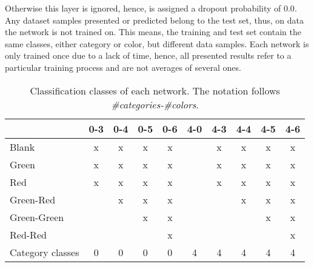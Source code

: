 Otherwise this layer is ignored, hence, is assigned a dropout probability of $0.0$.
Any dataset samples presented or predicted belong to the test set, thus, on data the network is not trained on.
This means, the training and test set contain the same classes, either category or color, but different data samples.
Each network is only trained once due to a lack of time, hence, all presented results refer to a particular training process and are not averages of several ones.
\begin{table}[]
\centering
\caption[Classification classes of each network]{Classification classes of each network. The notation follows \emph{\#categories-\#colors}.}
\label{tab:network-classes}
\begin{tabular}{l|ccccccccc}
               & \multicolumn{1}{l}{0-3} & \multicolumn{1}{l}{0-4} & \multicolumn{1}{l}{0-5} & \multicolumn{1}{l}{0-6} & \multicolumn{1}{l}{4-0} & \multicolumn{1}{l}{4-3} & \multicolumn{1}{l}{4-4} & \multicolumn{1}{l}{4-5} & \multicolumn{1}{l}{4-6} \\ \hline
Blank          & x                       & x                       & x                       & x                       &                         & x                       & x                       & x                       & x                       \\
Green          & x                       & x                       & x                       & x                       &                         & x                       & x                       & x                       & x                       \\
Red            & x                       & x                       & x                       & x                       &                         & x                       & x                       & x                       & x                       \\
Green-Red      &                         & x                       & x                       & x                       &                         &                         & x                       & x                       & x                       \\
Green-Green    &                         &                         & x                       & x                       &                         &                         &                         & x                       & x                       \\
Red-Red        &                         &                         &                         & x                       &                         &                         &                         &                         & x                       \\ \hline
Category classes & 0                       & 0                       & 0                       & 0                       & 4                       & 4                       & 4                       & 4                       & 4                      
\end{tabular}
\end{table}



